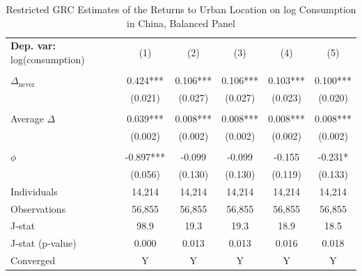 \begin{table}[htbp] \centering \begin{threeparttable}
 \caption{Restricted GRC Estimates of the Returns to Urban Location on log Consumption in China, Balanced Panel} 
 \label{tab:GRC_CHN_consumption_urban_bal} 
\begin{tabular}{l ccccc} \toprule  \textbf{Dep. var:}  log(consumption) 
                    &\multicolumn{1}{c}{(1)}   &\multicolumn{1}{c}{(2)}   &\multicolumn{1}{c}{(3)}   &\multicolumn{1}{c}{(4)}   &\multicolumn{1}{c}{(5)}   \\
                    &               &               &               &               &               \\
\addlinespace
$\Delta_{\text{never}}$&       0.424***&       0.106***&       0.106***&       0.103***&       0.100***\\
                    &     (0.021)   &     (0.027)   &     (0.027)   &     (0.023)   &     (0.020)   \\
                    &               &               &               &               &               \\
\addlinespace
Average $\Delta$    &       0.039***&       0.008***&       0.008***&       0.008***&       0.008***\\
                    &     (0.002)   &     (0.002)   &     (0.002)   &     (0.002)   &     (0.002)   \\
                    &               &               &               &               &               \\
\addlinespace
$\phi$              &      -0.897***&      -0.099   &      -0.099   &      -0.155   &      -0.231*  \\
                    &     (0.056)   &     (0.130)   &     (0.130)   &     (0.119)   &     (0.133)   \\
\addlinespace
Individuals         &      14,214   &      14,214   &      14,214   &      14,214   &      14,214   \\
Observations        &      56,855   &      56,855   &      56,855   &      56,855   &      56,855   \\
J-stat              &        98.9   &        19.3   &        19.3   &        18.9   &        18.5   \\
J-stat (p-value)    &       0.000   &       0.013   &       0.013   &       0.016   &       0.018   \\
Converged           &           Y   &           Y   &           Y   &           Y   &           Y   \\

\end{tabular}
\end{threeparttable}
\end{table}
